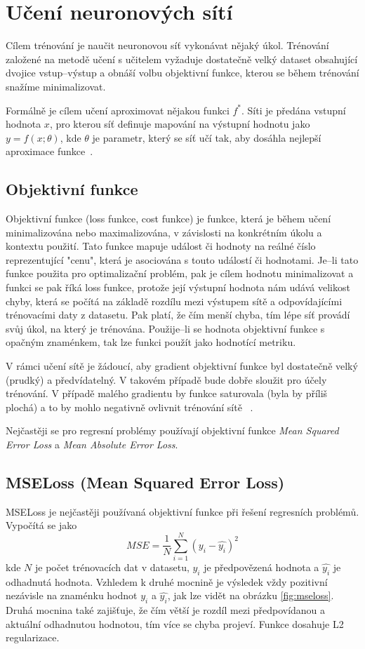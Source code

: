\section{Učení neuronových sítí}
Cílem trénování je naučit neuronovou síť vykonávat nějaký úkol. Trénování založené na metodě učení s učitelem vyžaduje dostatečně velký dataset obsahující dvojice vstup--výstup a obnáší volbu objektivní funkce, kterou se během trénování snažíme minimalizovat. 

Formálně je cílem učení aproximovat nějakou funkci $f^\ast$. Síti je předána vstupní hodnota $x$, pro kterou síť definuje mapování na výstupní hodnotu jako $y = f(x; \theta)$, kde $\theta$ je parametr, který se síť učí tak, aby dosáhla nejlepší aproximace funkce~\cite[p.~163]{mitdeeplearning}.


\subsection{Objektivní funkce}
Objektivní funkce (loss funkce, cost funkce) je funkce, která je během učení minimalizována nebo maximalizována, v závislosti na konkrétním úkolu a kontextu použití. Tato funkce mapuje událost či hodnoty na reálné číslo reprezentující  "cenu", která je asociována s touto událostí či hodnotami. Je--li tato funkce použita pro optimalizační problém, pak je cílem hodnotu minimalizovat a funkci se pak říká loss funkce, protože její výstupní hodnota nám udává velikost chyby, která se počítá na základě rozdílu mezi výstupem sítě a odpovídajícími trénovacími daty z datasetu. Pak platí, že čím menší chyba, tím lépe síť provádí svůj úkol, na který je trénována. Použije--li se hodnota objektivní funkce s opačným znaménkem, tak lze funkci použít jako hodnotící metriku.

V rámci učení sítě je žádoucí, aby gradient objektivní funkce byl dostatečně velký (prudký) a předvídatelný. V takovém případě bude dobře sloužit pro účely trénování. V případě malého gradientu by funkce saturovala (byla by příliš plochá) a to by mohlo negativně ovlivnit trénování sítě~ \cite{mitdeeplearning}. 

Nejčastěji se pro regresní problémy používají objektivní funkce \textit{Mean Squared Error Loss} a \textit{Mean Absolute Error Loss}.


\subsection*{MSELoss (Mean Squared Error Loss)}
MSELoss je nejčastěji používaná objektivní funkce při řešení regresních problémů. Vypočítá se jako
\begin{equation}
  MSE = \frac{1}{N}\sum_{i=1}^N(y_i - \hat{y_i})^2
\end{equation}
kde $N$ je počet trénovacích dat v datasetu, $y_i$ je předpovězená hodnota a $\hat{y_i}$ je odhadnutá hodnota. Vzhledem k druhé mocnině je výsledek vždy pozitivní nezávisle na znaménku hodnot $y_i$ a $\hat{y_i}$, jak lze vidět na obrázku \ref{fig:mseloss}. Druhá mocnina také zajišťuje, že čím větší je rozdíl mezi předpovídanou a aktuální odhadnutou hodnotou, tím více se chyba projeví. Funkce dosahuje L2 regularizace.

